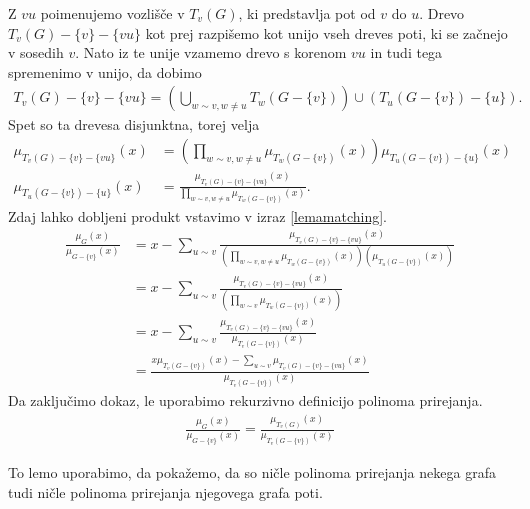 \begin{dokaz}
    Z \(vu\) poimenujemo vozlišče v \(T_v(G)\), ki predstavlja pot od \(v\) do \(u\). Drevo \(T_v(G) - \{v\} - \{vu\}\) kot prej razpišemo kot unijo vseh dreves poti, ki se začnejo v sosedih \(v\). Nato iz te unije vzamemo drevo s korenom \(vu\) in tudi tega spremenimo v unijo, da dobimo
    \begin{align*}
        T_v(G) - \{v\} - \{vu\} = \left(\bigcup_{w\sim v, w\neq u} T_w(G-\{v\})\right) \cup (T_u(G-\{v\}) - \{u\}).
    \end{align*}
    Spet so ta drevesa disjunktna, torej velja
    \begin{align*}
        \mu_{T_v(G) - \{v\} - \{vu\}}(x) &= \left(\prod_{w\sim v, w\neq u} \mu_{T_w(G-\{v\})}(x)\right) \mu_{T_u(G-\{v\}) - \{u\}}(x) \\
        \mu_{T_u(G-\{v\}) - \{u\}}(x) &= \frac{\mu_{T_v(G) - \{v\} - \{vu\}}(x)}{\prod_{w\sim v, w\neq u} \mu_{T_w(G-\{v\})}(x)}.
    \end{align*}
    Zdaj lahko dobljeni produkt vstavimo v izraz \ref{lemamatching}.
    \begin{align*}
        \frac{\mu_G(x)}{\mu_{G-\{v\}}(x)} & =x - \sum_{u\sim v}\frac{\mu_{T_v(G) - \{v\} - \{vu\}}(x)}{(\prod_{w\sim v, w\neq u} \mu_{T_w(G-\{v\})}(x))(\mu_{T_u(G-\{v\})}(x))} \\
                                          & = x - \sum_{u\sim v}\frac{\mu_{T_v(G) - \{v\} - \{vu\}}(x)}{(\prod_{w\sim v} \mu_{T_w(G-\{v\})}(x))}                                \\
                                          & = x - \sum_{u\sim v}\frac{\mu_{T_v(G) - \{v\} - \{vu\}}(x)}{\mu_{T_v(G-\{v\})}(x)}                                                  \\
                                          & = \frac{x \mu_{T_v(G-\{v\})}(x) - \sum_{u\sim v} \mu_{T_v(G) - \{v\} - \{vu\}}(x)}{\mu_{T_v(G-\{v\})}(x)}
    \end{align*}
    Da zaključimo dokaz, le uporabimo rekurzivno definicijo polinoma prirejanja.
    \begin{align*}
        \frac{\mu_G(x)}{\mu_{G-\{v\}}(x)} = \frac{\mu_{T_v(G)}(x)}{\mu_{T_v(G-\{v\})}(x)}
    \end{align*}
\end{dokaz}

To lemo uporabimo, da pokažemo, da so ničle polinoma prirejanja nekega grafa tudi ničle polinoma prirejanja njegovega grafa poti.


